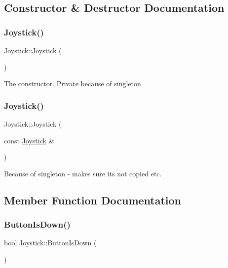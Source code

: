 \subsection{Constructor \& Destructor Documentation}
\hypertarget{class_joystick_a158b1f77b78717efbf1b8fac43b1fcef}{}\label{class_joystick_a158b1f77b78717efbf1b8fac43b1fcef} 
\subsubsection{\texorpdfstring{Joystick()}{Joystick()}\hspace{0.1cm}{\footnotesize\ttfamily [1/2]}}
{\footnotesize\ttfamily Joystick\+::\+Joystick (\begin{DoxyParamCaption}{ }\end{DoxyParamCaption})\hspace{0.3cm}{\ttfamily [private]}}

The constructor. Private because of singleton \hypertarget{class_joystick_a93a3cb5bc4d4ea7c94709b8730257f13}{}\label{class_joystick_a93a3cb5bc4d4ea7c94709b8730257f13} 
\subsubsection{\texorpdfstring{Joystick()}{Joystick()}\hspace{0.1cm}{\footnotesize\ttfamily [2/2]}}
{\footnotesize\ttfamily Joystick\+::\+Joystick (\begin{DoxyParamCaption}\item[{const \hyperlink{class_joystick}{Joystick} \&}]{ }\end{DoxyParamCaption})\hspace{0.3cm}{\ttfamily [delete]}}

Because of singleton -\/ makes sure its not copied etc. 

\subsection{Member Function Documentation}
\hypertarget{class_joystick_a35c4969f04f76a83860d9adf6ca3adba}{}\label{class_joystick_a35c4969f04f76a83860d9adf6ca3adba} 
\subsubsection{\texorpdfstring{Button\+Is\+Down()}{ButtonIsDown()}}
{\footnotesize\ttfamily bool Joystick\+::\+Button\+Is\+Down (\begin{DoxyParamCaption}{ }\end{DoxyParamCaption})}

